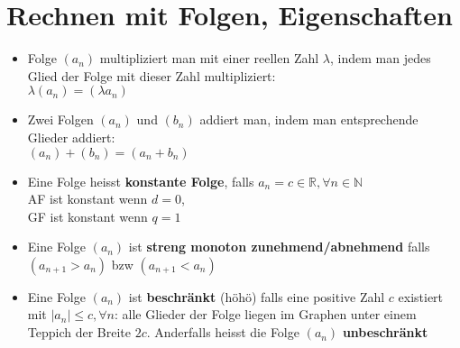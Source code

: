 \documentclass[../main.tex]{subfiles}
\begin{document}
\section{Rechnen mit Folgen, Eigenschaften}
\begin{itemize}
    \item Folge $(a_n)$ multipliziert man mit einer reellen Zahl $\lambda$, indem man jedes Glied der Folge mit dieser Zahl multipliziert: \\ [7pt]
    $\lambda(a_n) = (\lambda a_n)$
    \item Zwei Folgen $(a_n)$ und $(b_n)$ addiert man, indem man entsprechende Glieder addiert: \\ [7pt]
    $(a_n)+(b_n) = (a_n + b_n)$
    \item Eine Folge heisst \textbf{
        konstante Folge}, falls $a_n = c \in \mathbb{R}, \forall n \in \mathbb{N}$ \\
    AF ist konstant wenn $d=0$, \\
    GF ist konstant wenn $q=1$
    \item Eine Folge $(a_n)$ ist \textbf{streng monoton zunehmend/abnehmend} falls $(a_{n+1} > a_n)$ bzw $(a_{n+1} < a_n)$
    \item Eine Folge $(a_n)$ ist \textbf{beschränkt} (höhö) falls eine positive Zahl $c$ existiert mit $|a_n|\leq c, \forall n$: alle Glieder der Folge liegen im Graphen unter einem Teppich der Breite $2c$. Anderfalls heisst die Folge $(a_n)$ \textbf{unbeschränkt}
\end{itemize}
\end{document}
